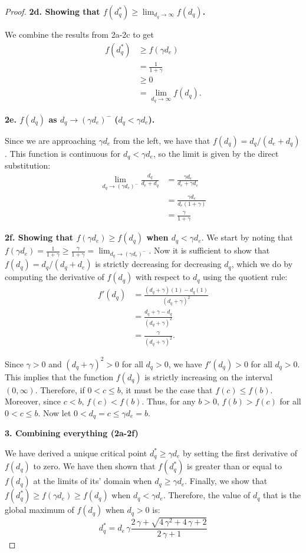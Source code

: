 \begin{proof}
\textbf{2d. Showing that $f(d_q^*) \ge \lim_{d_q\rightarrow\infty} f(d_q)$.}

We combine the results from 2a-2c to get
\begin{align*}
    f(d_q^*) &\ge f(\gamma d_e) \\
    &= \frac{1}{1+\gamma} \\
    &\ge 0  \\
    &= \lim_{d_q \rightarrow \infty} f(d_q).
\end{align*}

\textbf{2e. $f(d_q)$ as $d_q \rightarrow (\gamma d_e)^-$ ($d_q < \gamma d_e$).}

Since we are approaching $\gamma d_e$ from the left, we have that $f(d_q) = d_q/(d_e + d_q)$. This function is continuous for $d_q < \gamma d_e$, so the limit is given by the direct substitution:
\begin{align*}
\lim_{d_q \rightarrow (\gamma d_e)^-} \frac{d_q}{d_e + d_q} &= \frac{\gamma d_e}{d_e + \gamma d_e} \\
&= \frac{\gamma d_e}{d_e(1 + \gamma)} \\
&= \frac{\gamma}{1 + \gamma}
\end{align*}

\textbf{2f. Showing that $f(\gamma d_e) \ge f(d_q)$ when $d_q < \gamma d_e$}.
We start by noting that $f(\gamma d_e) = \frac{1}{1+\gamma} \ge \frac{\gamma}{1+\gamma} = \lim_{d_q\rightarrow(\gamma d_e)^-}$. Now it is sufficient to show that $f(d_q) = d_q/(d_q + d_e)$ is strictly decreasing for decreasing $d_q$, which we do by computing the derivative of $f(d_q)$ with respect to $d_q$ using the quotient rule:
\begin{align*}
    f'(d_q) &= \frac{(d_q+\gamma)(1) - d_q(1)}{(d_q+\gamma)^2} \\
    &= \frac{d_q+\gamma-d_q}{(d_q+\gamma)^2} \\
    &= \frac{\gamma}{(d_q+\gamma)^2}.
\end{align*}

Since $\gamma > 0$ and $(d_q+\gamma)^2 > 0$ for all $d_q > 0$, we have $f'(d_q) > 0$ for all $d_q > 0$. This implies that the function $f(d_q)$ is strictly increasing on the interval $(0, \infty)$. Therefore, if $0 < c \le b$, it must be the case that $f(c) \le f(b)$. Moreover, since $c < b$, $f(c) < f(b)$. Thus, for any $b>0$, $f(b) > f(c)$ for all $0< c \le b$. Now let $0 < d_q = c \leq \gamma d_e = b$.


\textbf{3. Combining everything (2a-2f)}

We have derived a unique critical point $d_q^* \ge \gamma d_e$ by setting the first derivative of $f(d_q)$ to zero. We have then shown that $f(d_q^*)$ is greater than or equal to $f(d_q)$ at the limits of its' domain when $d_q \ge \gamma d_e$. Finally, we show that $f(d_q^*) \ge f(\gamma d_e) \ge f(d_q)$ when $d_q < \gamma d_e$. Therefore, the value of $d_q$ that is the global maximum of $f(d_q)$ when $d_q>0$ is:
\begin{equation*}
\boxed{d_q^* = d_e\,\gamma \frac{2\,\gamma + \sqrt{4\,\gamma^2 +4\,\gamma +2}}{2\,\gamma +1}}
\end{equation*}
\end{proof}



